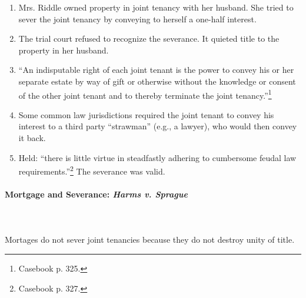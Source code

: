 \begin{enumerate}
    \item Mrs. Riddle owned property in joint tenancy with her husband. She 
    tried to sever the joint tenancy by conveying to herself a one-half 
    interest.
    \item The trial court refused to recognize the severance. It quieted title 
    to the property in her husband.
    \item ``An indisputable right of each joint tenant is the power to convey 
    his or her separate estate by way of gift or otherwise without the 
    knowledge or consent of the other joint tenant and to thereby terminate 
    the joint tenancy.''\footnote{Casebook p. 325.}
    \item Some common law jurisdictions required the joint tenant to convey 
    his interest to a third party ``strawman'' (e.g., a lawyer), who would 
    then convey it back.
    \item Held: ``there is little virtue in steadfastly adhering to cumbersome 
    feudal law requirements.''\footnote{Casebook p. 327.} The severance was 
    valid.
\end{enumerate}

\paragraph{Mortgage and Severance: \emph{Harms v. Sprague}}
~\\\\
Mortages do not sever joint tenancies because they do not destroy unity of 
title.

